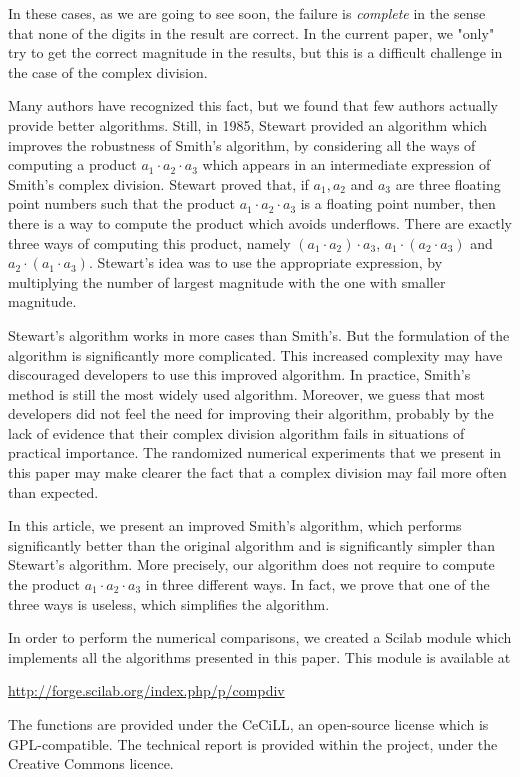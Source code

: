 \documentclass{paper}
\begin{document}
In these cases, as we are going to see soon, the failure 
is \emph{complete} in the sense that 
none of the digits in the result are correct. 
In the current paper, we "only" try to get the correct 
magnitude in the results, but this 
is a difficult challenge in the case of the complex division. 

Many authors have recognized this fact, but we found that few authors 
actually provide better algorithms. 
Still, in 1985, Stewart \cite{214414,Stewart:1986:CNC} provided an 
algorithm which improves the robustness of Smith's algorithm, 
by considering all the ways of computing a product 
$a_1 \cdot a_2 \cdot a_3$ which appears in an intermediate 
expression of Smith's complex division. 
Stewart proved that, if $a_1,a_2$ and $a_3$ are three floating point 
numbers such that the product $a_1 \cdot a_2 \cdot a_3$ is a 
floating point number, then there is a way to compute the product which 
avoids underflows.
There are exactly three ways of computing this product, namely 
$(a_1 \cdot a_2) \cdot a_3$, $a_1 \cdot (a_2 \cdot a_3)$ and 
$a_2 \cdot (a_1 \cdot a_3)$. 
Stewart's idea was to use the appropriate expression, by 
multiplying the number of largest magnitude with the one with 
smaller magnitude. 

Stewart's algorithm works in more cases than Smith's. 
But the formulation of the algorithm is significantly more complicated. 
This increased complexity may have discouraged developers 
to use this improved algorithm. 
In practice, Smith's method is still the most widely used 
algorithm. 
Moreover, we guess that most developers did not feel the 
need for improving their algorithm, probably by the 
lack of evidence that their complex division algorithm fails 
in situations of practical importance. 
The randomized numerical experiments that we present in this paper 
may make clearer the fact that a complex division may fail more often 
than expected. 

In this article, we present an improved Smith's algorithm, 
which performs significantly better than the original 
algorithm and is significantly simpler than Stewart's algorithm. 
More precisely, our algorithm does not require to compute 
the product $a_1 \cdot a_2 \cdot a_3$ in three different 
ways. 
In fact, we prove that one of the three ways is useless, 
which simplifies the algorithm. 

In order to perform the numerical comparisons, we created 
a Scilab module which implements all the algorithms presented 
in this paper. 
This module is available at 
\begin{center}
\url{http://forge.scilab.org/index.php/p/compdiv}
\end{center}
The functions are provided under the CeCiLL, an open-source 
license which is GPL-compatible. 
The technical report \cite{BaudinSmithImpCD2011} is provided within the project, 
under the Creative Commons licence.
\end{document}
